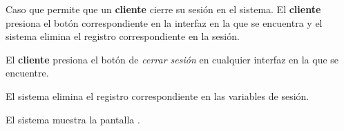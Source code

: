 %
%

{
  Caso que permite que un \textbf{cliente} cierre su sesión en el sistema.
  El \textbf{cliente} presiona el botón correspondiente en la interfaz en la
  que se encuentra y el sistema elimina el registro correspondiente en la
  sesión.

  \begin{trayectoriaPrincipal}

    \item El \textbf{cliente} presiona el botón de \textit{cerrar sesión} en
      cualquier interfaz en la que se encuentre.

    \item El sistema elimina el registro correspondiente en las variables de
      sesión.

    \item El sistema muestra la pantalla .

  \end{trayectoriaPrincipal}
}
